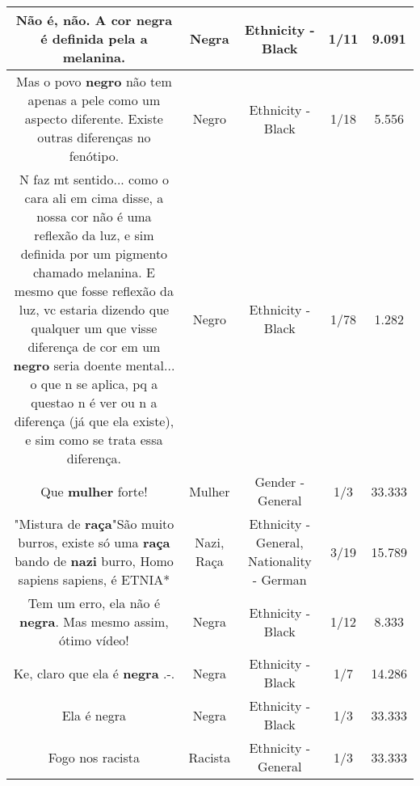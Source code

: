 \documentclass[11pt]{article}
\newlength\mylength
\begin{document}
\begin{center}
\begin{longtable}{|C{.65\mylength}|C{.30\mylength}|C{.12\mylength}|C{.12\mylength}|C{.12\mylength}|}
  \small Não é, não. A cor \textbf{negra} é definida pela a melanina.\normalsize   & Negra & Ethnicity - Black & 1/11 & 9.091 \\  \hline
  \small Mas o povo \textbf{negro} não tem apenas a pele como um aspecto diferente. Existe outras diferenças no fenótipo.\normalsize   & Negro & Ethnicity - Black & 1/18 & 5.556 \\  \hline
  \small N faz mt sentido... como o cara ali em cima disse, a nossa cor não é uma reflexão da luz, e sim definida por um pigmento chamado melanina. E mesmo que fosse reflexão da luz, vc estaria dizendo que qualquer um que visse diferença de cor em um \textbf{negro} seria doente mental... o que n se aplica, pq a questao n é ver ou n a diferença (já que ela existe), e sim como se trata essa diferença.\normalsize   & Negro & Ethnicity - Black & 1/78 & 1.282 \\  \hline
  \small Que \textbf{mulher} forte!\normalsize   & Mulher & Gender - General & 1/3 & 33.333 \\  \hline
  \small "Mistura de \textbf{raça}"São muito burros, existe só uma \textbf{raça} bando de \textbf{nazi} burro, Homo sapiens sapiens, é ETNIA*\normalsize   & Nazi, Raça & Ethnicity - General, Nationality - German & 3/19 & 15.789 \\  \hline
  \small Tem um erro, ela não é \textbf{negra}. Mas mesmo assim, ótimo vídeo!\normalsize   & Negra & Ethnicity - Black & 1/12 & 8.333 \\  \hline
  \small Ke, claro que ela é \textbf{negra} .-.\normalsize   & Negra & Ethnicity - Black & 1/7 & 14.286 \\  \hline
  \small Ela é negra\normalsize   & Negra & Ethnicity - Black & 1/3 & 33.333 \\  \hline
  \small Fogo nos racista\normalsize   & Racista & Ethnicity - General & 1/3 & 33.333 \\  \hline

\end{longtable}
\end{center}
\end{document}
